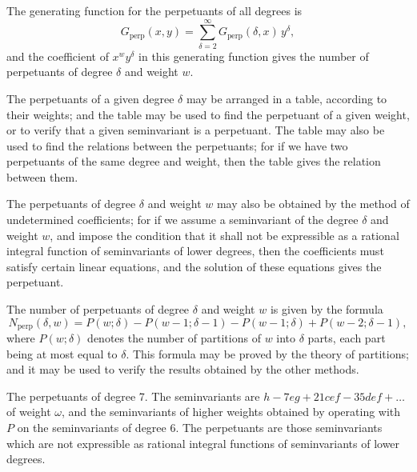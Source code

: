 \documentclass[11pt,a4paper]{book}
\begin{document}
{{{\setcounter{art}{62}
\begin{art}
The generating function for the perpetuants of all degrees is
\[
G_{\text{perp}}(x, y) = \sum_{\delta=2}^{\infty} G_{\text{perp}}(\delta, x)\,y^{\delta},
\]
and the coefficient of $x^{w}y^{\delta}$ in this generating function gives the number of perpetuants of degree $\delta$ and weight $w$.
\end{art}

\setcounter{art}{63}
\begin{art}
The perpetuants of a given degree $\delta$ may be arranged in a table, according to their weights; and the table may be used to find the perpetuant of a given weight, or to verify that a given seminvariant is a perpetuant. The table may also be used to find the relations between the perpetuants; for if we have two perpetuants of the same degree and weight, then the table gives the relation between them.
\end{art}

\setcounter{art}{64}
\begin{art}
The perpetuants of degree $\delta$ and weight $w$ may also be obtained by the method of undetermined coefficients; for if we assume a seminvariant of the degree $\delta$ and weight $w$, and impose the condition that it shall not be expressible as a rational integral function of seminvariants of lower degrees, then the coefficients must satisfy certain linear equations, and the solution of these equations gives the perpetuant.
\end{art}

\setcounter{art}{65}
\begin{art}
The number of perpetuants of degree $\delta$ and weight $w$ is given by the formula
\[
N_{\text{perp}}(\delta, w) = P(w; \delta) - P(w - 1; \delta - 1) - P(w - 1; \delta) + P(w - 2; \delta - 1),
\]
where $P(w; \delta)$ denotes the number of partitions of $w$ into $\delta$ parts, each part being at most equal to $\delta$. This formula may be proved by the theory of partitions; and it may be used to verify the results obtained by the other methods.
\end{art}

\setcounter{art}{66}
\begin{art}
The perpetuants of degree 7. The seminvariants are $h - 7eg + 21cef - 35def + \ldots$ of weight $\omega$, and the seminvariants of higher weights obtained by operating with $P$ on the seminvariants of degree 6. The perpetuants are those seminvariants which are not expressible as rational integral functions of seminvariants of lower degrees.
\end{art}

}}}
\end{document}
